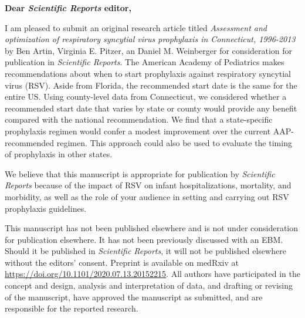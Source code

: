 \documentclass[10pt]{letter} %
\begin{document}

\begin{letter}{} %


\opening{\textbf{Dear \textit{Scientific Reports} editor,}}

I am pleased to submit an original research article titled \textit{Assessment and optimization of respiratory syncytial virus prophylaxis in Connecticut, 1996-2013} by Ben Artin, Virginia E. Pitzer, an Daniel M. Weinberger for consideration for publication in \textit{Scientific Reports}. The American Academy of Pediatrics makes recommendations about when to start prophylaxis against respiratory syncytial virus (RSV). Aside from Florida, the recommended start date is the same for the entire US. Using county-level data from Connecticut, we considered whether a recommended start date that varies by state or county would provide any benefit compared with the national recommendation. We find that a state-specific prophylaxis regimen would confer a modest improvement over the current AAP-recommended regimen. This approach could also be used to evaluate the timing of prophylaxis in other states.

We believe that this manuscript is appropriate for publication by \textit{Scientific Reports} because of the impact of RSV on infant hospitalizations, mortality, and morbidity, as well as the role of your audience in setting and carrying out RSV prophylaxis guidelines. 

This manuscript has not been published elsewhere and is not under consideration for publication elsewhere. It has not been previously discussed with an EBM. Should it be published in \textit{Scientific Reports}, it will not be published elsewhere without the editors' consent. Preprint is available on medRxiv at \url{https://doi.org/10.1101/2020.07.13.20152215}. All authors have participated in the concept and design, analysis and interpretation of data, and drafting or revising of the manuscript, have approved the manuscript as submitted, and are responsible for the reported research.


\end{letter}
\end{document}

